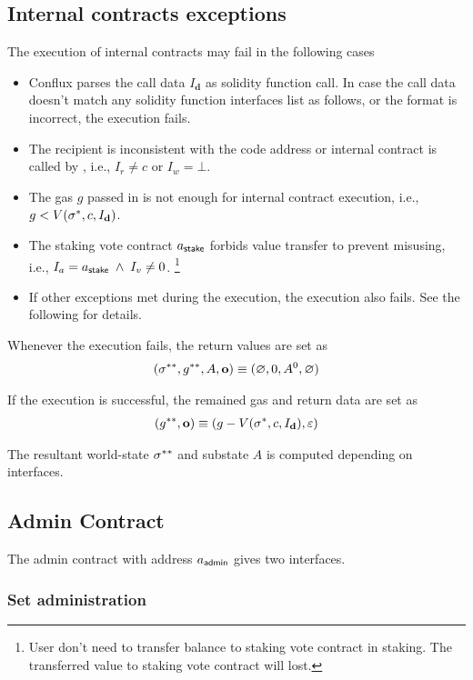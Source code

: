 \subsection{Internal contracts exceptions}
The execution of internal contracts may fail in the following cases 
\begin{itemize}
	\item Conflux parses the call data $I_\mathbf{d}$ as solidity function call. In case the call data doesn't match any solidity function interfaces list as follows, or the format is incorrect, the execution fails. 
	\item The recipient is inconsistent with the code address or internal contract is called by , i.e., $I_r\neq c$ or $I_w=\bot$. 
	\item The gas $g$ passed in is not enough for internal contract execution, i.e., $g<V(\mathbf{\sigma}^*,c,I_\mathbf{d})$. 
	\item The staking vote contract $a_{\sf stake}$ forbids value transfer to prevent misusing, i.e., $I_a= a_{\sf stake}\;\wedge \; I_v\neq 0$. \footnote{User don't need to transfer balance to staking vote contract in staking. The transferred value to staking vote contract will lost. }
	\item If other exceptions met during the execution, the execution also fails. See the following for details. 
\end{itemize}

Whenever the execution fails, the return values are set as
\begin{align}
	\left(\mathbf{\sigma}^{**}, g^{**},  A, \mathbf{o} \right)\equiv (\varnothing,0,A^0,\varnothing)
\end{align} 

If the execution is successful, the remained gas and return data are set as 
\begin{align}
	\left(g^{**}, \mathbf{o} \right)\equiv (g-V(\mathbf{\sigma}^*,c,I_\mathbf{d}),\mathbb{\varepsilon})
\end{align}

The resultant world-state $\mathbf{\sigma}^{**}$ and substate $A$ is computed depending on interfaces. 


\subsection{Admin Contract}

The admin contract with address $a_{\sf admin}$ gives two interfaces.

\subsubsection{Set administration}

